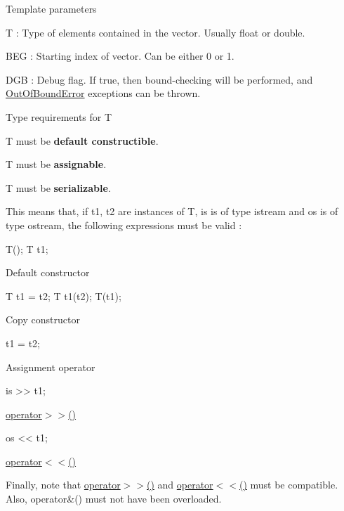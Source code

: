 \begin{DoxyParagraph}{Template parameters}

\begin{DoxyItemize}
\item {\ttfamily T} \+: Type of elements contained in the vector. Usually {\ttfamily float} or {\ttfamily double}.
\item {\ttfamily B\+EG} \+: Starting index of vector. Can be either 0 or 1.
\item {\ttfamily D\+GB} \+: Debug flag. If {\ttfamily true}, then bound-\/checking will be performed, and {\ttfamily \mbox{\hyperlink{structKalman_1_1OutOfBoundError}{Out\+Of\+Bound\+Error}}} exceptions can be thrown.
\end{DoxyItemize}
\end{DoxyParagraph}
\begin{DoxyParagraph}{Type requirements for T}

\begin{DoxyItemize}
\item {\ttfamily T} must be {\bfseries default constructible}.
\item {\ttfamily T} must be {\bfseries assignable}.
\item {\ttfamily T} must be {\bfseries serializable}.
\end{DoxyItemize}This means that, if {\ttfamily t1}, {\ttfamily t2} are instances of {\ttfamily T}, {\ttfamily is} is of type {\ttfamily istream} and {\ttfamily os} is of type {\ttfamily ostream}, the following expressions must be valid \+:
\begin{DoxyItemize}
\item 
\begin{DoxyCode}
T(); T t1; 
\end{DoxyCode}
 Default constructor
\item 
\begin{DoxyCode}
T t1 = t2; T t1(t2); T(t1); 
\end{DoxyCode}
 Copy constructor
\item 
\begin{DoxyCode}
t1 = t2; 
\end{DoxyCode}
 Assignment operator
\item 
\begin{DoxyCode}
is >> t1; 
\end{DoxyCode}
 {\ttfamily \mbox{\hyperlink{namespaceKalman_a72ce00e837fa126ab3961f879e3d8b87}{operator$>$$>$()}}} 
\item 
\begin{DoxyCode}
os << t1; 
\end{DoxyCode}
 {\ttfamily \mbox{\hyperlink{namespaceKalman_a531684dadbec9b34313492f6d5121598}{operator$<$$<$()}}} 
\end{DoxyItemize}Finally, note that {\ttfamily \mbox{\hyperlink{namespaceKalman_a72ce00e837fa126ab3961f879e3d8b87}{operator$>$$>$()}}} and {\ttfamily \mbox{\hyperlink{namespaceKalman_a531684dadbec9b34313492f6d5121598}{operator$<$$<$()}}} must be compatible. Also, {\ttfamily operator\&()} must not have been overloaded. 
\end{DoxyParagraph}


